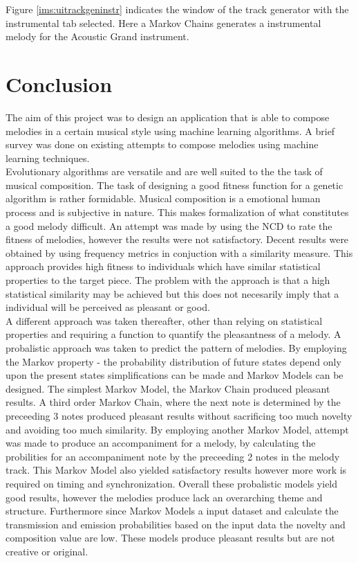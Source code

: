 Figure \ref{ims:uitrackgeninstr} indicates the window of the track generator with the instrumental tab selected. Here a Markov Chains generates a instrumental melody for the Acoustic Grand instrument.


\chapter{Conclusion}
The aim of this project was to design an application that is able to compose melodies in a certain musical style using machine learning algorithms. A brief survey was done on existing attempts to compose melodies using machine learning techniques.
\\

Evolutionary algorithms are versatile and are well suited to the the task of musical composition. The task of designing a good fitness function for a genetic algorithm is rather formidable.
Musical composition is a emotional human process and is subjective in nature. This makes formalization of what constitutes a good melody difficult. 
An attempt was made by using the \ac{NCD} to rate the fitness of melodies, however the results were not satisfactory.
Decent results were obtained by using frequency metrics in conjuction with a similarity measure. This approach provides high fitness to individuals which have similar statistical properties to the target piece. The problem with the approach is that a high statistical similarity may be achieved but this does not necesarily imply that a individual will be perceived as pleasant or good.
\\

A different approach was taken thereafter, other than relying on statistical properties and requiring a function to quantify the pleasantness of a melody. A probalistic approach was taken to predict the pattern of melodies. By employing the Markov property - the probability distribution of future states depend only upon the present states simplifications can be made and Markov Models can be designed. The simplest Markov Model, the Markov Chain produced pleasant results. A third order Markov Chain, where the next note is determined by the preceeding 3 notes produced pleasant results without sacrificing too much novelty and avoiding too much similarity. By employing another Markov Model, attempt was made to produce an accompaniment for a melody, by calculating the probilities for an accompaniment note by the preceeding 2 notes in the melody track. This Markov Model also yielded satisfactory results however more work is required on timing and synchronization.
Overall these probalistic models yield good results, however the melodies produce lack an overarching theme and structure. Furthermore since Markov Models a input dataset and calculate the transmission and emission probabilities based on the input data the novelty and composition value are low. These models produce pleasant results but are not creative or original.
\\

